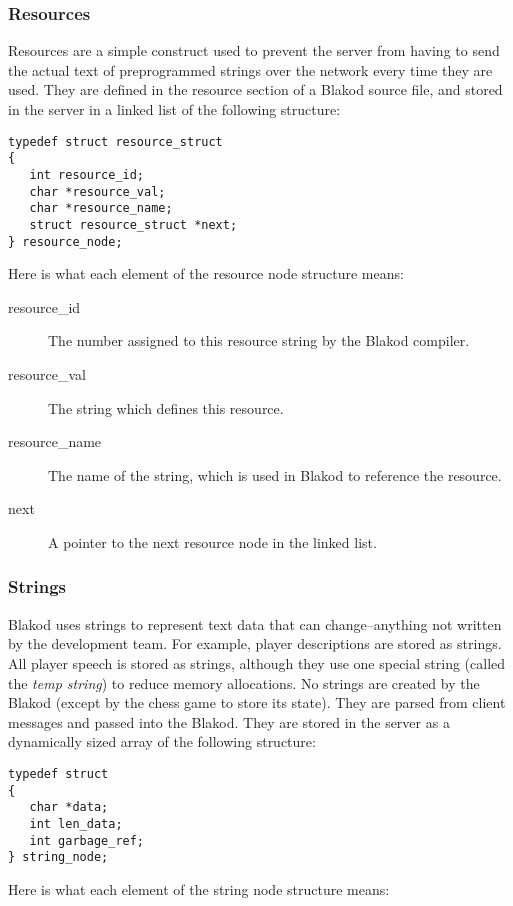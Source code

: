 \subsubsection{Resources}

Resources are a simple construct used to prevent the server from having to
send the actual text of preprogrammed strings over the network every time
they are used.  They are defined in the resource section of a Blakod source
file, and stored in the server in a linked list of the following structure:
\begin{verbatim}
typedef struct resource_struct
{
   int resource_id;
   char *resource_val;
   char *resource_name;
   struct resource_struct *next;
} resource_node;
\end{verbatim}

Here is what each element of the resource node structure means:

\begin{description}
\item[resource\_id] The number assigned to this resource string by the
Blakod compiler.
\item[resource\_val] The string which defines this resource.
\item[resource\_name] The name of the string, which is used in Blakod
to reference the resource.
\item[next] A pointer to the next resource node in the linked list.
\end{description}

\subsubsection{Strings}

Blakod uses strings to represent text data that can change--anything not
written by the development team.  For example, player descriptions are
stored as strings.  All player speech is stored as strings, although
they use one special string (called the \textit{temp string}) to reduce
memory allocations.  No strings are created by the Blakod (except by the
chess game to store its state).  They are parsed from client messages and
passed into the Blakod.  They are stored in the server as a dynamically sized
array of the following structure:
\begin{verbatim}
typedef struct
{
   char *data;
   int len_data;
   int garbage_ref;
} string_node;
\end{verbatim}

Here is what each element of the string node structure means:


